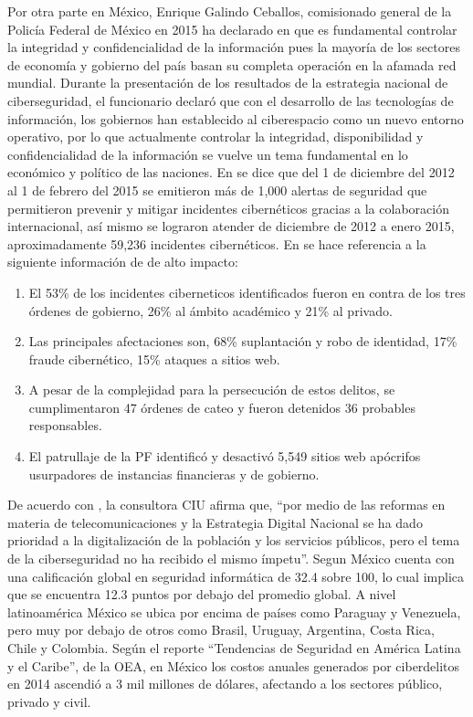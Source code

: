 \documentclass[runningheads,a4paper]{llncs}
\begin{document}
Por otra parte en México, Enrique Galindo Ceballos, comisionado general de la Policía Federal de México en 2015 ha declarado en \cite{Forbes_1} que es fundamental controlar la integridad y confidencialidad de la información pues la mayoría de los sectores de economía y gobierno del país basan su completa operación en la afamada red mundial. Durante la presentación de los resultados de la estrategia nacional de ciberseguridad, el funcionario declaró que con el desarrollo de las tecnologías de información, los gobiernos han establecido al ciberespacio como un nuevo entorno operativo, por lo que actualmente controlar la integridad, disponibilidad y confidencialidad de la información se vuelve un tema fundamental en lo económico y político de las naciones. En \cite{Forbes_1} se dice que del 1 de diciembre del 2012 al 1 de febrero del 2015 se emitieron más de 1,000 alertas de seguridad que permitieron prevenir y mitigar incidentes cibernéticos gracias a la colaboración internacional, así mismo se lograron atender de diciembre de 2012 a enero 2015, aproximadamente 59,236 incidentes cibernéticos. En \cite{Forbes_1} se hace referencia a la siguiente información de de alto impacto: 

\begin{enumerate}
	\item El 53\% de los incidentes ciberneticos identificados fueron en contra de los tres órdenes de gobierno, 26\% al ámbito académico y 21\% al privado.\\
	\item Las principales afectaciones son, 68\% suplantación y robo de identidad, 17\% fraude cibernético, 15\% ataques a sitios web.\\
	\item A pesar de la complejidad para la persecución de estos delitos, se cumplimentaron 47 órdenes de cateo y fueron detenidos 36 probables responsables.\\
	\item El patrullaje de la \gls{PF} identificó y desactivó 5,549 sitios web apócrifos usurpadores de instancias financieras y de gobierno.
\end{enumerate}

De acuerdo con \cite{OEM_1}, la consultora \gls{CIU} afirma que, ``por medio de las reformas en materia de telecomunicaciones y la Estrategia Digital Nacional se ha dado prioridad a la digitalización de la población y los servicios públicos, pero el tema de la ciberseguridad no ha recibido el mismo ímpetu''. Segun \cite{OEM_1} México cuenta con una calificación global en seguridad informática de 32.4 sobre 100, lo cual implica que se encuentra 12.3 puntos por debajo del promedio global. A nivel latinoamérica México se ubica por encima de países como Paraguay y Venezuela, pero muy por debajo de otros como Brasil, Uruguay, Argentina, Costa Rica, Chile y Colombia. Según el reporte ``Tendencias de Seguridad en América Latina y el Caribe'', de la \gls{OEA}, en México los costos anuales generados por ciberdelitos en 2014 ascendió a 3 mil millones de dólares, afectando a los sectores público, privado y civil. \\
\end{document}
